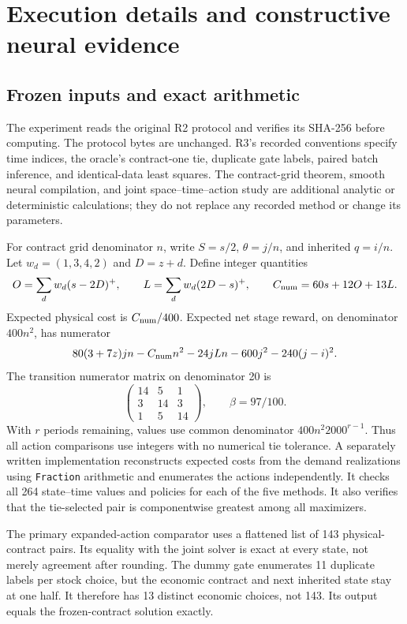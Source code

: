\section{Execution details and constructive neural evidence}
\subsection{Frozen inputs and exact arithmetic}
The experiment reads the original R2 protocol and verifies its SHA-256 before computing. The protocol bytes are unchanged. R3's recorded conventions specify time indices, the oracle's contract-one tie, duplicate gate labels, paired batch inference, and identical-data least squares. The contract-grid theorem, smooth neural compilation, and joint space--time--action study are additional analytic or deterministic calculations; they do not replace any recorded method or change its parameters.

For contract grid denominator $n$, write $S=s/2$, $\theta=j/n$, and inherited $q=i/n$. Let $w_d=(1,3,4,2)$ and $D=z+d$. Define integer quantities
\[
 O=\sum_d w_d(s-2D)^+,\qquad L=\sum_d w_d(2D-s)^+,
 \qquad C_{\rm num}=60s+12O+13L.
\]
Expected physical cost is $C_{\rm num}/400$. Expected net stage reward, on denominator $400n^2$, has numerator
\begin{equation}
 80(3+7z)jn-C_{\rm num}n^2-24jLn-600j^2-240(j-i)^2.
\end{equation}
The transition numerator matrix on denominator 20 is
\[
 \begin{pmatrix}14&5&1\\3&14&3\\1&5&14\end{pmatrix},
 \qquad\beta=97/100.
\]
With $r$ periods remaining, values use common denominator $400n^2 2000^{r-1}$. Thus all action comparisons use integers with no numerical tie tolerance. A separately written implementation reconstructs expected costs from the demand realizations using \texttt{Fraction} arithmetic and enumerates the actions independently. It checks all 264 state--time values and policies for each of the five methods. It also verifies that the tie-selected pair is componentwise greatest among all maximizers.

The primary expanded-action comparator uses a flattened list of 143 physical-contract pairs. Its equality with the joint solver is exact at every state, not merely agreement after rounding. The dummy gate enumerates 11 duplicate labels per stock choice, but the economic contract and next inherited state stay at one half. It therefore has 13 distinct economic choices, not 143. Its output equals the frozen-contract solution exactly.

